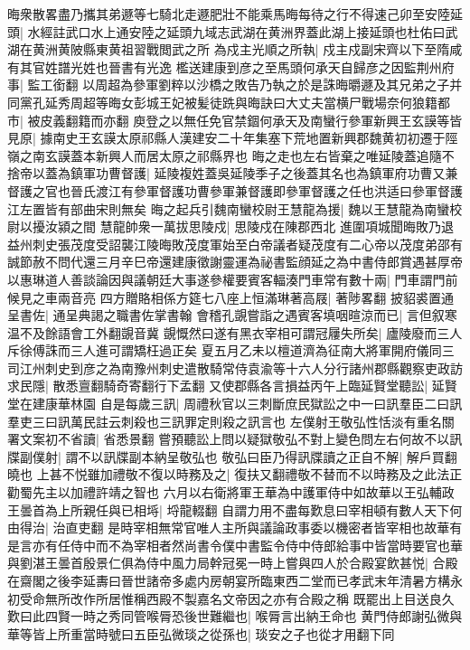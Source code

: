 晦衆散畧盡乃攜其弟遯等七騎北走遯肥壯不能乘馬晦每待之行不得速己卯至安陸延頭|{
	水經註武口水上通安陸之延頭九域志武湖在黄洲界蓋此湖上接延頭也杜佑曰武湖在黄洲黄陂縣東黄祖習戰閲武之所}
為戍主光順之所執|{
	戍主戍副宋齊以下至隋咸有其官姓譜光姓也晉書有光逸}
檻送建康到彦之至馬頭何承天自歸彦之因監荆州府事|{
	監工銜翻}
以周超為參軍劉粹以沙橋之敗告乃執之於是誅晦㬭遯及其兄弟之子并同黨孔延秀周超等晦女彭城王妃被髪徒跣與晦訣曰大丈夫當横尸戰場奈何狼籍都市|{
	被皮義翻籍而亦翻}
庾登之以無任免官禁錮何承天及南蠻行參軍新興王玄謨等皆見原|{
	據南史王玄謨太原祁縣人漢建安二十年集塞下荒地置新興郡魏黄初初遷于陘嶺之南玄謨蓋本新興人而居太原之祁縣界也}
晦之走也左右皆棄之唯延陵蓋追隨不捨帝以蓋為鎮軍功曹督護|{
	延陵複姓蓋吳延陵季子之後蓋其名也為鎮軍府功曹又兼督護之官也晉氏渡江有參軍督護功曹參軍兼督護即參軍督護之任也洪适曰參軍督護江左置皆有部曲宋則無矣}
晦之起兵引魏南蠻校尉王慧龍為援|{
	魏以王慧龍為南蠻校尉以擾汝潁之間}
慧龍帥衆一萬拔思陵戍|{
	思陵戍在陳郡西北}
進圍項城聞晦敗乃退益州刺史張茂度受詔襲江陵晦敗茂度軍始至白帝議者疑茂度有二心帝以茂度弟邵有誠節赦不問代還三月辛巳帝還建康徵謝靈運為祕書監顔延之為中書侍郎賞遇甚厚帝以惠琳道人善談論因與議朝廷大事遂參權要賓客輻湊門車常有數十兩|{
	門車謂門前候見之車兩音亮}
四方贈賂相係方筵七八座上恒滿琳著高屐|{
	著陟畧翻}
披貂裘置通呈書佐|{
	通呈典謁之職書佐掌書翰}
會稽孔覬嘗詣之遇賓客填咽暄涼而已|{
	言但叙寒温不及餘語會工外翻覬音冀}
覬慨然曰遂有黑衣宰相可謂冠屨失所矣|{
	廬陵廢而三人斥徐傅誅而三人進可謂矯枉過正矣}
夏五月乙未以檀道濟為征南大將軍開府儀同三司江州刺史到彦之為南豫州刺史遣散騎常侍袁渝等十六人分行諸州郡縣觀察吏政訪求民隱|{
	散悉亶翻騎奇寄翻行下孟翻}
又使郡縣各言損益丙午上臨延賢堂聽訟|{
	延賢堂在建康華林園}
自是每歲三訊|{
	周禮秋官以三刺斷庶民獄訟之中一曰訊羣臣二曰訊羣吏三曰訊萬民註云刺殺也三訊罪定則殺之訊言也}
左僕射王敬弘性恬淡有重名關署文案初不省讀|{
	省悉景翻}
嘗預聽訟上問以疑獄敬弘不對上變色問左右何故不以訊牒副僕射|{
	謂不以訊牒副本納呈敬弘也}
敬弘曰臣乃得訊牒讀之正自不解|{
	解戶買翻曉也}
上甚不悦雖加禮敬不復以時務及之|{
	復扶又翻禮敬不替而不以時務及之此法正勸蜀先主以加禮許靖之智也}
六月以右衛將軍王華為中護軍侍中如故華以王弘輔政王曇首為上所親任與已相埓|{
	埒龍輟翻}
自謂力用不盡每歎息曰宰相頓有數人天下何由得治|{
	治直吏翻}
是時宰相無常官唯人主所與議論政事委以機密者皆宰相也故華有是言亦有任侍中而不為宰相者然尚書令僕中書監令侍中侍郎給事中皆當時要官也華與劉湛王曇首殷景仁俱為侍中風力局幹冠冕一時上嘗與四人於合殿宴飲甚悦|{
	合殿在齋閣之後李延夀曰晉世諸帝多處内房朝宴所臨東西二堂而已孝武末年清暑方構永初受命無所改作所居惟稱西殿不製嘉名文帝因之亦有合殿之稱}
既罷出上目送良久歎曰此四賢一時之秀同管喉脣恐後世難繼也|{
	喉脣言出納王命也}
黄門侍郎謝弘微與華等皆上所重當時號曰五臣弘微琰之從孫也|{
	琰安之子也從才用翻下同}
